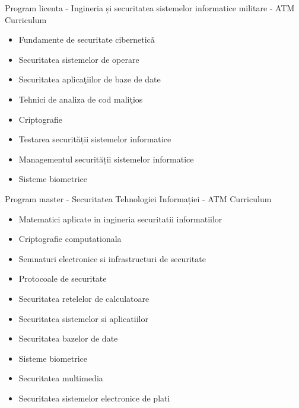 \documentclass[pdf]{beamer}
\begin{document}
\begin{frame}{Program licenta - Ingineria și securitatea sistemelor informatice militare - ATM}
Curriculum
\begin{itemize}
\item
Fundamente de securitate ciberneticǎ

\item
Securitatea sistemelor de operare

\item
Securitatea aplicaţiilor de baze de date

\item
Tehnici de analiza de cod maliţios

\item
Criptografie

\item
Testarea securității sistemelor informatice

\item
Managementul securității sistemelor informatice

\item
Sisteme biometrice

\end{itemize}
\end{frame}



\begin{frame}{Program master - Securitatea Tehnologiei Informației - ATM}
Curriculum
\begin{itemize}
\item
Matematici aplicate in ingineria securitatii informatiilor

\item
Criptografie computationala

\item
Semnaturi electronice si infrastructuri de securitate

\item
Protocoale de securitate

\item
Securitatea retelelor de calculatoare

\item
Securitatea sistemelor si aplicatiilor

\item
Securitatea bazelor de date

\item
Sisteme biometrice

\item
Securitatea multimedia

\item
Securitatea sistemelor electronice de plati

\end{itemize}
\end{frame}
\end{document}

